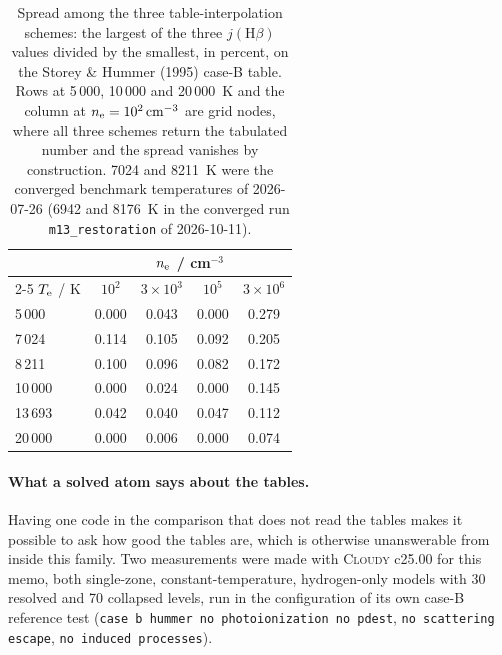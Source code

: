 \documentclass[english,a4paper]{my_memo}
\newcommand{\code}[1]{\texttt{#1}}
\newcommand{\Cloudy}{\textsc{Cloudy}}
\newcommand{\Te}{T_{\rm e}}
\newcommand{\nelec}{n_{\rm e}}
\begin{document}
\begin{table}[htbp]
\centering
\caption{Spread among the three table-interpolation schemes: the largest of
the three $j(\mathrm{H}\beta)$ values divided by the smallest, in percent, on
the Storey \& Hummer (1995) case-B table.  Rows at 5\,000, 10\,000 and
20\,000~K and the column at $\nelec = 10^2\,\mathrm{cm^{-3}}$ are grid nodes,
where all three schemes return the tabulated number and the spread vanishes by
construction.  7024 and 8211~K were the converged benchmark temperatures of
2026-07-26 (6942 and 8176~K in the converged run \code{m13\_restoration}
of 2026-10-11).}
\label{tab:interp}
\begin{tabular}{lcccc}
\toprule
& \multicolumn{4}{c}{$\nelec$ / cm$^{-3}$} \\
\cmidrule(l){2-5}
$\Te$ / K & $10^{2}$ & $3\times10^{3}$ & $10^{5}$ & $3\times10^{6}$ \\
\midrule
 5\,000 & 0.000 & 0.043 & 0.000 & 0.279 \\
 7\,024 & 0.114 & 0.105 & 0.092 & 0.205 \\
 8\,211 & 0.100 & 0.096 & 0.082 & 0.172 \\
10\,000 & 0.000 & 0.024 & 0.000 & 0.145 \\
13\,693 & 0.042 & 0.040 & 0.047 & 0.112 \\
20\,000 & 0.000 & 0.006 & 0.000 & 0.074 \\
\bottomrule
\end{tabular}
\end{table}

\paragraph{What a solved atom says about the tables.}  Having one code in the
comparison that does not read the tables makes it possible to ask how good the
tables are, which is otherwise unanswerable from inside this family.  Two
measurements were made with \Cloudy{} c25.00 for this memo, both single-zone,
constant-temperature, hydrogen-only models with 30 resolved and 70 collapsed
levels, run in the configuration of its own case-B reference test
(\code{case b hummer no photoionization no pdest}, \code{no scattering escape},
\code{no induced processes}).
\end{document}
